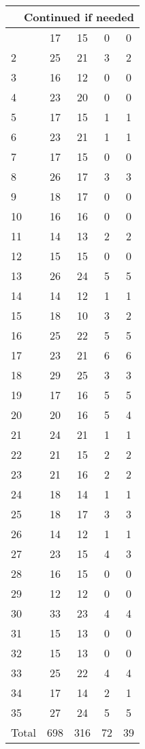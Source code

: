 \begin{center}
\begin{longtable}{l|c|c|c|c}
\hline \multicolumn{5}{|r|}{{Continued if needed}} \\ \hline
\endfoot 
1 & 17 & 15 & 0 & 0\\ \hline
2 & 25 & 21 & 3 & 2\\ \hline
3 & 16 & 12 & 0 & 0\\ \hline
4 & 23 & 20 & 0 & 0\\ \hline
5 & 17 & 15 & 1 & 1\\ \hline
6 & 23 & 21 & 1 & 1\\ \hline
7 & 17 & 15 & 0 & 0\\ \hline
8 & 26 & 17 & 3 & 3\\ \hline
9 & 18 & 17 & 0 & 0\\ \hline
10 & 16 & 16 & 0 & 0\\ \hline
11 & 14 & 13 & 2 & 2\\ \hline
12 & 15 & 15 & 0 & 0\\ \hline
13 & 26 & 24 & 5 & 5\\ \hline
14 & 14 & 12 & 1 & 1\\ \hline
15 & 18 & 10 & 3 & 2\\ \hline
16 & 25 & 22 & 5 & 5\\ \hline
17 & 23 & 21 & 6 & 6\\ \hline
18 & 29 & 25 & 3 & 3\\ \hline
19 & 17 & 16 & 5 & 5\\ \hline
20 & 20 & 16 & 5 & 4\\ \hline
21 & 24 & 21 & 1 & 1\\ \hline
22 & 21 & 15 & 2 & 2\\ \hline
23 & 21 & 16 & 2 & 2\\ \hline
24 & 18 & 14 & 1 & 1\\ \hline
25 & 18 & 17 & 3 & 3\\ \hline
26 & 14 & 12 & 1 & 1\\ \hline
27 & 23 & 15 & 4 & 3\\ \hline
28 & 16 & 15 & 0 & 0\\ \hline
29 & 12 & 12 & 0 & 0\\ \hline
30 & 33 & 23 & 4 & 4\\ \hline
31 & 15 & 13 & 0 & 0\\ \hline
32 & 15 & 13 & 0 & 0\\ \hline
33 & 25 & 22 & 4 & 4\\ \hline
34 & 17 & 14 & 2 & 1\\ \hline
35 & 27 & 24 & 5 & 5\\ \hline
\hline \hline
Total & 698 & 316 & 72 & 39



\end{longtable}
\end{center}

